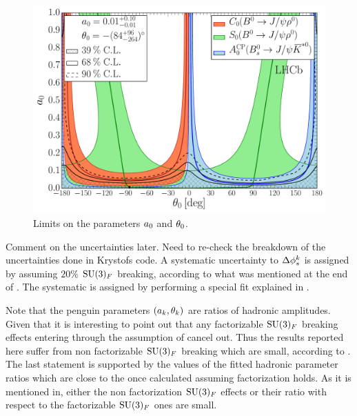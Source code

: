 \begin{figure}[!t]
  \centering
  \includegraphics[trim=0.0cm 0.0cm 0.0cm 0.0cm, clip=true,scale=0.33]{Figures/Chapter5/Penguin_Contribution_Ang_vs_Abs_allB2VV_Long.pdf}
  \caption{Limits on the parameters $a_{0}$ and $\theta_{0}$. }
  \label{pengPlot_long}
\end{figure}

{\color{red} Comment on the uncertainties later. Need to re-check the breakdown of the uncertainties done in Krystofs code.}
A systematic uncertainty to $\Delta\phi_{s}^{k}$ is assigned by assuming $20\%$ $\mathrm{SU}(3)_F$ breaking,
according to what was mentioned at the end of . The systematic is assigned
by performing a special fit explained in .

Note that the penguin parameters $(a_k,\theta_k)$ are ratios of hadronic amplitudes. Given that it is
interesting to point out that any factorizable $\mathrm{SU}(3)_F$ breaking effects entering through the assumption
of  cancel out.
Thus the results reported here suffer from non factorizable $\mathrm{SU}(3)_F$ breaking which are small,
according to \cite{DeBruyn-thesis}. The last statement is supported by the values of the fitted hadronic parameter
ratios which are close to the once calculated assuming factorization holds. As it is mentioned in\cite{DeBruyn-thesis},
either the non factorization $\mathrm{SU}(3)_F$ effects or their ratio with respect to the factorizable $\mathrm{SU}(3)_F$
ones are small.


